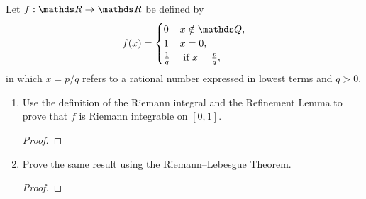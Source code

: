 \documentclass{../homework}
\begin{document}
\begin{Exercise}
	Let $f:\R\to \R$ be defined by
	\begin{equation*}
		f(x) =
		\begin{cases}
			0 & x \notin \Q, \\
			1 & x =0, \\
			\frac{1}{q} & \text{ if $x = \frac{p}{q}$},
		\end{cases}
	\end{equation*}
	in which $x = p/q$ refers to a rational number expressed in lowest
  terms and $q > 0$.
	\begin{enumerate}
  \item Use the definition of the Riemann integral and the Refinement
    Lemma to prove that $f$ is Riemann integrable on $[0,1]$.

    \begin{solution}
      \begin{proof}

      \end{proof}
    \end{solution}

	\item Prove the same result using the Riemann--Lebesgue Theorem.

    \begin{solution}
      \begin{proof}

      \end{proof}
    \end{solution}
  \end{enumerate}
\end{Exercise}
\end{document}
